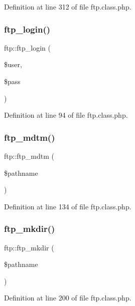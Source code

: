 Definition at line 312 of file ftp.\+class.\+php.

\hypertarget{classftp_a59f3acaa1cdc8e828eeac35d87ff2b9d}{}\label{classftp_a59f3acaa1cdc8e828eeac35d87ff2b9d} 
\subsubsection{\texorpdfstring{ftp\+\_\+login()}{ftp\_login()}}
{\footnotesize\ttfamily ftp\+::ftp\+\_\+login (\begin{DoxyParamCaption}\item[{}]{\$user,  }\item[{}]{\$pass }\end{DoxyParamCaption})}



Definition at line 94 of file ftp.\+class.\+php.

\hypertarget{classftp_a1a50510c0717d4d869e9cb73be0bbe7d}{}\label{classftp_a1a50510c0717d4d869e9cb73be0bbe7d} 
\subsubsection{\texorpdfstring{ftp\+\_\+mdtm()}{ftp\_mdtm()}}
{\footnotesize\ttfamily ftp\+::ftp\+\_\+mdtm (\begin{DoxyParamCaption}\item[{}]{\$pathname }\end{DoxyParamCaption})}



Definition at line 134 of file ftp.\+class.\+php.

\hypertarget{classftp_a68c762768c22eec736e8d86b9d068287}{}\label{classftp_a68c762768c22eec736e8d86b9d068287} 
\subsubsection{\texorpdfstring{ftp\+\_\+mkdir()}{ftp\_mkdir()}}
{\footnotesize\ttfamily ftp\+::ftp\+\_\+mkdir (\begin{DoxyParamCaption}\item[{}]{\$pathname }\end{DoxyParamCaption})}



Definition at line 200 of file ftp.\+class.\+php.

